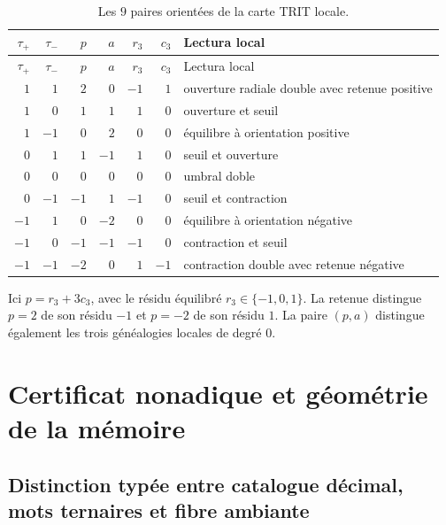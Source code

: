 \begin{longtable}{rrrrrrp{}}
\caption{Les \(9\) paires orientées de la carte TRIT locale.}
\label{espiral:tab:ap-nueve-pares}\\
\toprule
\(\tau_+\)&\(\tau_-\)&\(p\)&\(a\)&\(r_3\)&\(c_3\)&Lectura local\\
\midrule
\endfirsthead
\toprule
\(\tau_+\)&\(\tau_-\)&\(p\)&\(a\)&\(r_3\)&\(c_3\)&Lectura local\\
\midrule
\endhead
\( 1\)&\( 1\)&\( 2\)&\( 0\)&\(-1\)&\( 1\)&ouverture radiale double avec retenue positive\\
\( 1\)&\( 0\)&\( 1\)&\( 1\)&\( 1\)&\( 0\)&ouverture et seuil\\
\( 1\)&\(-1\)&\( 0\)&\( 2\)&\( 0\)&\( 0\)&équilibre à orientation positive\\
\( 0\)&\( 1\)&\( 1\)&\(-1\)&\( 1\)&\( 0\)&seuil et ouverture\\
\( 0\)&\( 0\)&\( 0\)&\( 0\)&\( 0\)&\( 0\)&umbral doble\\
\( 0\)&\(-1\)&\(-1\)&\( 1\)&\(-1\)&\( 0\)&seuil et contraction\\
\(-1\)&\( 1\)&\( 0\)&\(-2\)&\( 0\)&\( 0\)&équilibre à orientation négative\\
\(-1\)&\( 0\)&\(-1\)&\(-1\)&\(-1\)&\( 0\)&contraction et seuil\\
\(-1\)&\(-1\)&\(-2\)&\( 0\)&\( 1\)&\(-1\)&contraction double avec retenue négative\\
\bottomrule
\end{longtable}

Ici \(p=r_3+3c_3\), avec le résidu équilibré \(r_3\in\{-1,0,1\}\). La retenue distingue \(p=2\) de son résidu \(-1\) et \(p=-2\) de son résidu \(1\). La paire \((p,a)\) distingue également les trois généalogies locales de degré \(0\).

\chapter{Certificat nonadique et géométrie de la mémoire}

\section{Distinction typée entre catalogue décimal, mots ternaires et fibre ambiante}

